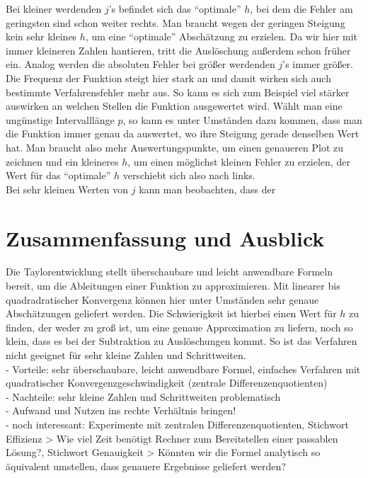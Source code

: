 \documentclass{scrartcl}
\begin{document}
Bei kleiner werdenden $j$'s befindet sich das "`optimale"' $h$, bei dem die Fehler am geringsten sind schon weiter rechts. Man braucht wegen der geringen Steigung kein sehr kleines $h$, um eine "`optimale"' Abschätzung zu erzielen. Da wir hier mit immer kleineren Zahlen hantieren, tritt die Auslöschung außerdem schon früher ein.
Analog werden die absoluten Fehler bei größer werdenden $j$'s immer größer.
Die Frequenz der Funktion steigt hier stark an und damit wirken sich auch bestimmte Verfahrensfehler mehr aus. So kann es sich zum Beispiel viel stärker auswirken an welchen Stellen die Funktion ausgewertet wird. Wählt man eine ungünstige Intervalllänge $p$, so kann es unter Umständen dazu kommen, dass man die Funktion immer genau da auswertet, wo ihre Steigung gerade denselben Wert hat.
Man braucht also mehr Auswertungspunkte, um einen genaueren Plot zu zeichnen und ein kleineres $h$, um einen möglichst kleinen Fehler zu erzielen, der Wert für das "`optimale"' $h$ verschiebt sich also nach links.\\
Bei sehr kleinen Werten von $j$ kann man beobachten, dass der

\pagebreak \section{Zusammenfassung und Ausblick}
\label{sec:zusammenfassung}
Die Taylorentwicklung stellt überschaubare und leicht anwendbare Formeln bereit, um die Ableitungen einer Funktion zu approximieren.
Mit linearer bis quadradratischer Konvergenz können hier unter Umständen sehr genaue Abschätzungen geliefert werden.
Die Schwierigkeit ist hierbei einen Wert für $h$ zu finden, der weder zu groß ist, um eine genaue Approximation zu liefern, noch so klein, dass es bei der Subtraktion zu Auslöschungen kommt.
So ist das Verfahren nicht geeignet für sehr kleine Zahlen und Schrittweiten.\\

- Vorteile: sehr überschaubare, leicht anwendbare Formel, einfaches Verfahren mit
quadratischer Konvergenzgeschwindigkeit (zentrale Differenzenquotienten) \\
- Nachteile: sehr kleine Zahlen und Schrittweiten problematisch \\
- Aufwand und Nutzen ins rechte Verhältnis bringen! \\
- noch interessant: Experimente mit zentralen Differenzenquotienten, Stichwort
Effizienz > Wie viel Zeit benötigt Rechner zum Bereitstellen einer passablen Lösung?,
Stichwort Genauigkeit > Könnten wir die Formel analytisch so äquivalent umstellen,
dass genauere Ergebnisse geliefert werden? \\



\end{document}
